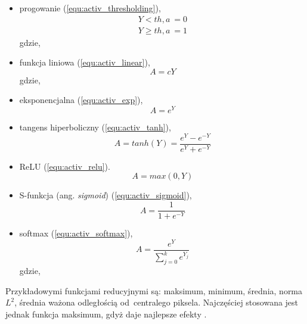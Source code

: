 {\begin{itemize}
\item progowanie (\ref{equ:activ_thresholding}),
\begin{equation}
\begin{aligned}
Y < th, a~= 0\\
Y \geq th, a~= 1
\end{aligned}
\label{equ:activ_thresholding}
\end{equation}
gdzie,
\item funkcja liniowa (\ref{equ:activ_linear}),
\begin{equation}
A = cY
\label{equ:activ_linear}
\end{equation}
gdzie,
\item eksponencjalna (\ref{equ:activ_exp}),
\begin{equation}
A = e^{Y}
\label{equ:activ_exp}
\end{equation}
\item tangens hiperboliczny (\ref{equ:activ_tanh}),
\begin{equation}
A = tanh(Y) =  \frac{e^{Y} - e^{-Y}}{e^{Y} + e^{-Y}}
\label{equ:activ_tanh}
\end{equation}
\item ReLU (\ref{equ:activ_relu}).
\begin{equation}
A = max(0,Y)
\label{equ:activ_relu}
\end{equation}

\item S-funkcja (ang. \textit{sigmoid}) (\ref{equ:activ_sigmoid}),
\begin{equation}
A = \frac{1}{1+e^{-Y}}
\label{equ:activ_sigmoid}
\end{equation}
\item softmax (\ref{equ:activ_softmax}),
\begin{equation}
A = \frac{e^{Y}}{\sum_{j=0}^{k} e^{Y_j}}
\label{equ:activ_softmax}
\end{equation}
gdzie,
\end{itemize}

Przykładowymi funkcjami reducyjnymi są: maksimum, minimum, średnia, norma \begin{math}L^{2}\end{math}, średnia ważona odległością od~centralego piksela. Najczęściej stosowana jest jednak funkcja maksimum, gdyż daje najlepsze efekty \cite{Scherer2010EvaluationOP}.
}

